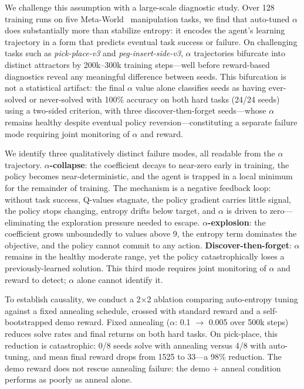 \documentclass[twocolumn]{article}
\begin{document}
We challenge this assumption with a large-scale diagnostic study. Over 128
training runs on five Meta-World~\citep{yu2020} manipulation tasks, we find
that auto-tuned $\alpha$ does substantially more than stabilize entropy: it
encodes the agent's learning trajectory in a form that predicts eventual task
success or failure. On challenging tasks such as \textit{pick-place-v3} and
\textit{peg-insert-side-v3}, $\alpha$ trajectories bifurcate into distinct
attractors by 200k--300k training steps---well before reward-based diagnostics
reveal any meaningful difference between seeds. This bifurcation is not a
statistical artifact: the final $\alpha$ value alone classifies seeds as having ever-solved or
never-solved with 100\% accuracy on both hard tasks (24/24 seeds) using a
two-sided criterion, with three discover-then-forget seeds---whose $\alpha$
remains healthy despite eventual policy reversion---constituting a separate
failure mode requiring joint monitoring of $\alpha$ and reward.

We identify three qualitatively distinct failure modes, all readable from the
$\alpha$ trajectory. \textbf{$\alpha$-collapse}: the coefficient decays to
near-zero early in training, the policy becomes near-deterministic, and the
agent is trapped in a local minimum for the remainder of training. The
mechanism is a negative feedback loop: without task success, Q-values stagnate,
the policy gradient carries little signal, the policy stops changing, entropy
drifts below target, and $\alpha$ is driven to zero---eliminating the
exploration pressure needed to escape. \textbf{$\alpha$-explosion}: the
coefficient grows unboundedly to values above 9, the entropy term dominates the
objective, and the policy cannot commit to any action. \textbf{Discover-then-forget}:
$\alpha$ remains in the healthy moderate range, yet the policy catastrophically
loses a previously-learned solution. This third mode requires joint monitoring
of $\alpha$ and reward to detect; $\alpha$ alone cannot identify it.

To establish causality, we conduct a 2$\times$2 ablation comparing auto-entropy
tuning against a fixed annealing schedule, crossed with standard reward and
a self-bootstrapped demo reward. Fixed annealing ($\alpha$: 0.1 $\to$ 0.005
over 500k steps) reduces solve rates and final returns on both hard tasks.
On pick-place, this reduction is catastrophic: 0/8 seeds solve with annealing
versus 4/8 with auto-tuning, and mean final reward drops from 1525 to 33---a
98\% reduction. The demo reward does not rescue annealing failure: the
demo + anneal condition performs as poorly as anneal alone.
\end{document}
